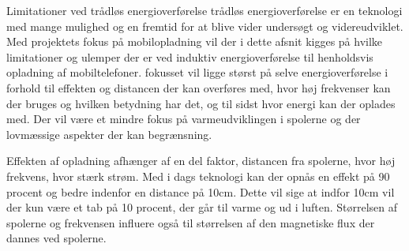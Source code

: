 Limitationer ved trådløs energioverførelse 
trådløs energioverførelse er en teknologi med mange mulighed og en fremtid for at blive vider undersøgt og  videreudviklet. Med projektets fokus på mobilopladning vil der i dette afsnit kigges på hvilke limitationer og ulemper der er ved induktiv energioverførelse til henholdsvis opladning af mobiltelefoner. fokusset vil ligge størst på selve energioverførelse i forhold til effekten og distancen der kan overføres med, hvor høj frekvenser kan der bruges og hvilken betydning har det, og til sidst hvor energi kan der oplades med. Der vil være et mindre fokus på varmeudviklingen i spolerne og der lovmæssige aspekter der kan begrænsning.

Effekten af opladning afhænger af en del faktor, distancen fra spolerne, hvor høj frekvens, hvor stærk strøm. Med i dags teknologi kan der opnås en effekt på 90 procent og bedre indenfor en distance på 10cm. Dette vil sige at indfor 10cm vil der kun være et tab på 10 procent, der går til varme og ud i luften. Størrelsen af spolerne og frekvensen influere også til størrelsen af den magnetiske flux der dannes ved spolerne.